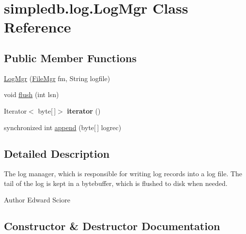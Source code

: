 \hypertarget{classsimpledb_1_1log_1_1LogMgr}{}\section{simpledb.\+log.\+Log\+Mgr Class Reference}
\label{classsimpledb_1_1log_1_1LogMgr}
\subsection*{Public Member Functions}
\begin{DoxyCompactItemize}
\item 
\hyperlink{classsimpledb_1_1log_1_1LogMgr_ac6a5610d12fca7bbc29d7ee59f4e27ab}{Log\+Mgr} (\hyperlink{classsimpledb_1_1file_1_1FileMgr}{File\+Mgr} fm, String logfile)
\item 
void \hyperlink{classsimpledb_1_1log_1_1LogMgr_a6624ee41235ebaa1297551d51a7946ac}{flush} (int lsn)
\item 
\mbox{\label{classsimpledb_1_1log_1_1LogMgr_a2d94e88ab5335f712fb34b2458b09358}} 
Iterator$<$ byte\mbox{[}$\,$\mbox{]}$>$ {\bfseries iterator} ()
\item 
synchronized int \hyperlink{classsimpledb_1_1log_1_1LogMgr_ae147d7c57574b8c580b8cac41d112727}{append} (byte\mbox{[}$\,$\mbox{]} logrec)
\end{DoxyCompactItemize}


\subsection{Detailed Description}
The log manager, which is responsible for writing log records into a log file. The tail of the log is kept in a bytebuffer, which is flushed to disk when needed. \begin{DoxyAuthor}{Author}
Edward Sciore 
\end{DoxyAuthor}


\subsection{Constructor \& Destructor Documentation}
\mbox{\label{classsimpledb_1_1log_1_1LogMgr_ac6a5610d12fca7bbc29d7ee59f4e27ab}} 
